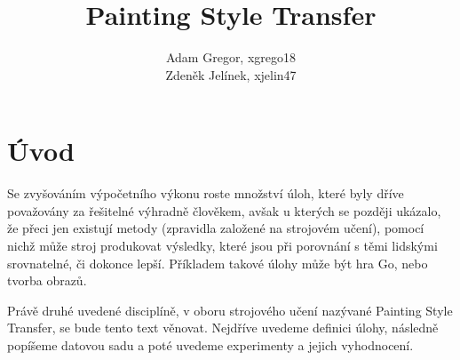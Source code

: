 \documentclass[twocolumn]{article}
\title{\Huge Painting Style Transfer}
\author{Adam Gregor, xgrego18 \\
	Zdeněk Jelínek, xjelin47
}
\begin{document}
	\maketitle
	
	\section*{Úvod}
	Se zvyšováním výpočetního výkonu roste množství úloh, které byly dříve považovány za řešitelné výhradně člověkem, avšak u kterých se později ukázalo, že přeci jen existují metody (zpravidla založené na strojovém učení), pomocí nichž může stroj produkovat výsledky, které jsou při porovnání s těmi lidskými srovnatelné, či dokonce lepší. Příkladem takové úlohy může být hra Go, nebo tvorba obrazů. 
	\par
	Právě druhé uvedené disciplíně, v oboru strojového učení nazývané Painting Style Transfer, se bude tento text věnovat. Nejdříve uvedeme definici úlohy, následně popíšeme datovou sadu a poté uvedeme experimenty a jejich vyhodnocení.
	
\end{document}

